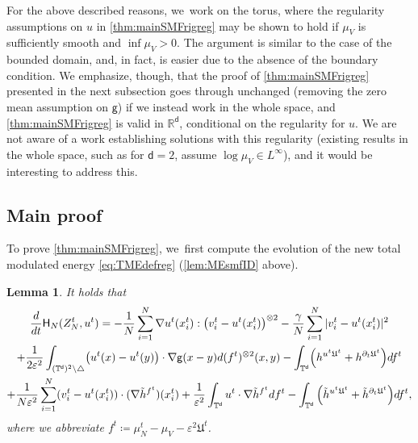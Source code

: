 \documentclass[10pt]{amsart}
\theoremstyle{plain}
\newtheorem{lemma}[thm]{Lemma}
\theoremstyle{definition}
\DeclarePairedDelimiter{\pa}{\lparen}{\rparen}
\let\div\relax
\DeclareMathOperator{\div}{\mathrm{div}}
\newcommand{\R}{{\mathbb{R}}}
\newcommand{\T}{{\mathbb{T}}}
\let\ga\gamma
\let\vep\varepsilon
\let\nab\nabla
\let\p\partial
\let\tl\tilde
\let\uz Z
\newcommand{\Uu}{\mathfrak{U}}
\newcommand{\Hr}{\mathsf{H}}
\renewcommand{\d}{\mathsf{d}}
\newcommand{\g}{{\mathsf{g}}}
\begin{document}
For the above described reasons, we~work on the torus, where the regularity assumptions on $u$ in \cref{thm:mainSMFrigreg} may be shown to hold if $\mu_V$ is sufficiently smooth and $\inf\mu_V>0$. The argument is similar to the case of the bounded domain, and, in fact, is easier due to the absence of the boundary condition. We emphasize, though, that the proof of \cref{thm:mainSMFrigreg} presented in the next subsection goes through unchanged (removing the zero mean assumption on $\g$) if we instead work in the whole space, and \cref{thm:mainSMFrigreg} is valid in $\R^\d$, conditional on the regularity for $u$. We are not aware of a work establishing solutions with this regularity (existing results in the whole space, such as \cite{Duerinckx2018} for $\d=2$, assume $\log\mu_V \in L^\infty$), and it would be interesting to address this.

\subsection{Main proof}
To prove \cref{thm:mainSMFrigreg}, we~first compute the evolution of the new total modulated energy \eqref{eq:TMEdefreg} (\cf \cref{lem:MEsmfID} above).

\begin{lemma}\label{lem:MEsmfIDreg}
It holds that
\begin{multline}\label{eq:MEsmfIDreg}
\frac{d}{dt}\Hr_{N}(\uz_N^t,u^t) = -\frac{1}{N}\sum_{i=1}^N \nab u^t(x_i^t) : \pa*{v_i^t - u^t(x_i^t)}^{\otimes 2} -\frac{\ga}{N}\sum_{i=1}^N |v_i^t-u^t(x_i^t)|^2\\
+\frac{1}{2\vep^2}\int_{(\T^\d)^2\setminus\triangle} \pa*{u^t(x)-u^t(y)}\cdot\nabla\g(x-y)d(f^t)^{\otimes 2}(x,y) -\int_{\T^\d}\pa*{\div h^{u^t\Uu^t}+h^{\p_t\Uu^t}}df^t\\
+\frac{1}{N\vep^2}\sum_{i=1}^N (v_i^t-u^t(x_i^t))\cdot(\nab\tl{h}^{f^t})(x_i^t) + \frac{1}{\vep^2}\int_{\T^\d}u^t\cdot\nab \tl{h}^{f^t} d{f^t} - \int_{\T^\d} \Big(\div \tl{h}^{u^t\Uu^t} +\tl{h}^{\p_t\Uu^t}\Big) df^t,
\end{multline}
where we abbreviate $f^t\coloneqq \mu_N^t - \mu_V-\vep^2\Uu^t$.
\end{lemma}
\end{document}
